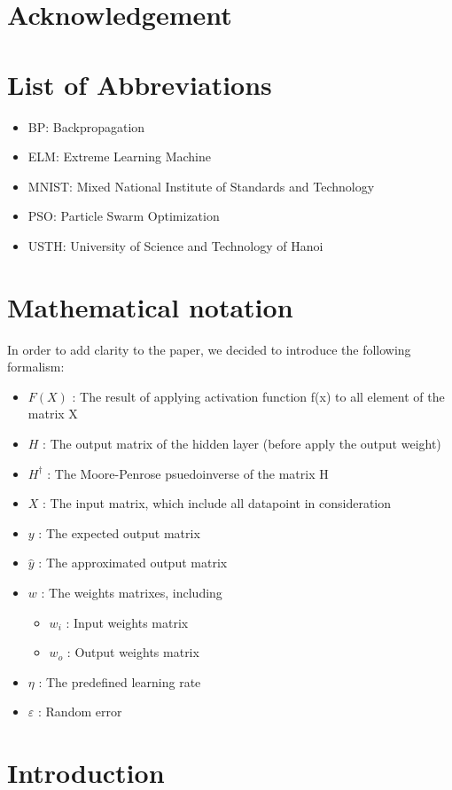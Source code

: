 \documentclass[11pt]{article}
\begin{document}
\section*{Acknowledgement}
\newpage
\section*{List of Abbreviations}
\begin{itemize}
    \item BP: Backpropagation
    \item ELM: Extreme Learning Machine
    \item MNIST: Mixed National Institute of Standards and Technology
    \item PSO: Particle Swarm Optimization
    \item USTH: University of Science and Technology of Hanoi
\end{itemize}
\newpage
\section*{Mathematical notation}
In order to add clarity to the paper, we decided to introduce the following formalism:
\begin{itemize}
    \item $F(X)$ : The result of applying activation function f(x) to all element of the matrix X
    \item $H$ : The output matrix of the hidden layer (before apply the output weight)
    \item $H^\dagger$ : The Moore-Penrose psuedoinverse of the matrix H
    \item $X$ : The input matrix, which include all datapoint in consideration
    \item $y$ : The expected output matrix
    \item $\hat{y}$ : The approximated output matrix
    \item $w$ : The weights matrixes, including
    \begin{itemize}
        \item $w_i$ : Input weights matrix
        \item $w_o$ : Output weights matrix
    \end{itemize}
    \item $\eta$ : The predefined learning rate
    \item $\varepsilon$ : Random error
\end{itemize}
\newpage
\tableofcontents
\newpage
\section{Introduction}
\newpage
\end{document}
